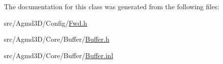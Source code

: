 The documentation for this class was generated from the following files\+:\begin{DoxyCompactItemize}
\item 
src/\+Agmd3\+D/\+Config/\hyperlink{_agmd3_d_2_config_2_fwd_8h}{Fwd.\+h}\item 
src/\+Agmd3\+D/\+Core/\+Buffer/\hyperlink{_buffer_8h}{Buffer.\+h}\item 
src/\+Agmd3\+D/\+Core/\+Buffer/\hyperlink{_buffer_8inl}{Buffer.\+inl}\end{DoxyCompactItemize}
